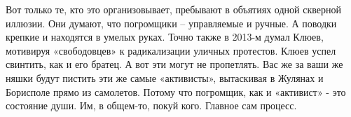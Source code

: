 Вот только те, кто это организовывает, пребывают в объятиях одной скверной
иллюзии. Они думают, что погромщики – управляемые и ручные. А поводки крепкие и
находятся в умелых руках. Точно также в 2013-м думал Клюев, мотивируя
«свободовцев» к радикализации уличных протестов. Клюев успел свинтить, как и
его братец. А вот эти могут не пропетлять. Вас же за ваши же няшки будут
пистить эти же самые «активисты», вытаскивая в Жулянах и Борисполе прямо из
самолетов. Потому что погромщик, как и «активист» - это состояние души. Им, в
общем-то, покуй кого. Главное сам процесс.

